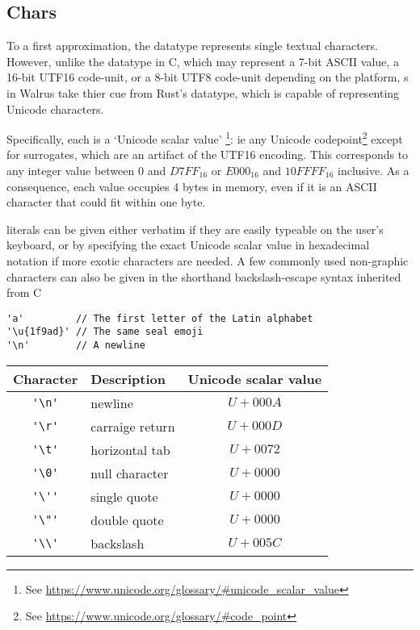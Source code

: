 \subsection{Chars}\label{section:reference:chars}
To a first approximation, the  datatype represents single textual characters.
However, unlike the  datatype in C, which may represent a 7-bit ASCII value,
a 16-bit UTF16 code-unit, or a 8-bit UTF8 code-unit depending on the platform,
s in Walrus take thier cue from Rust's  datatype, which is capable of
representing Unicode characters.

Specifically, each  is a `Unicode scalar value'
\footnote{See \url{https://www.unicode.org/glossary/#unicode_scalar_value}}:
ie any Unicode codepoint\footnote{See \url{https://www.unicode.org/glossary/#code_point}} except for surrogates, which are an artifact of the UTF16 encoding.
This corresponds to any integer value between $0$ and $D7FF_{16}$ or $E000_{16}$ and $10FFFF_{16}$
inclusive.
As a consequence, each  value occupies 4 bytes in memory, even if it is an ASCII character that could
fit within one byte.

 literals can be given either verbatim if they are easily typeable on the user's keyboard, or by
specifying the exact Unicode scalar value in hexadecimal notation if more exotic characters are needed.
A few commonly used non-graphic characters can also be given in the shorthand backslash-escape syntax
inherited from C

\begin{verbatim}
'a'         // The first letter of the Latin alphabet
'\u{1f9ad}' // The same seal emoji 
'\n'        // A newline
\end{verbatim}

\begin{tabular}{ clc }
    Character              & Description     & Unicode scalar value \\
    \toprule
    \verb$'\n'$ & newline         & $U+000A$             \\
    \verb$'\r'$ & carraige return & $U+000D$             \\
    \verb$'\t'$ & horizontal tab  & $U+0072$             \\
    \verb$'\0'$ & null character  & $U+0000$             \\
    \verb$'\''$ & single quote    & $U+0000$             \\
    \verb$'\"'$ & double quote    & $U+0000$             \\
    \verb$'\\'$ & backslash       & $U+005C$             \\
    \bottomrule
\end{tabular}


